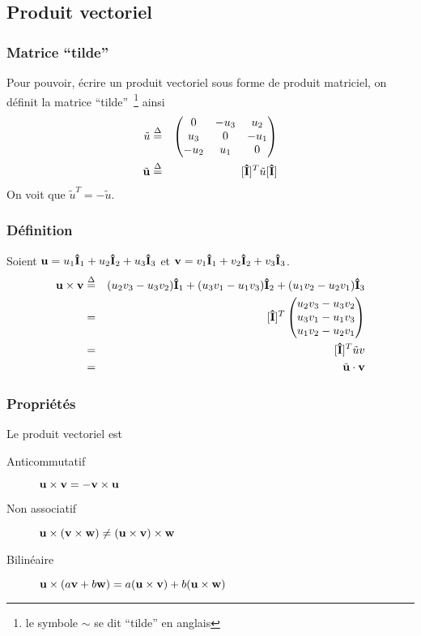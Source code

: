 \documentclass[11pt,a4paper]{article}
\newcommand\fv[1]{{\bf #1}} %
\newcommand\ui{{\bf\hat{I}}} %
\newcommand\eqdef{\stackrel{\Delta}{=}}
\begin{document}
\subsection{Produit vectoriel}

\subsubsection{Matrice ``tilde''}
Pour pouvoir, écrire un produit vectoriel sous forme de produit matriciel, on définit la matrice ``tilde''~\footnote{le symbole $\sim$ se dit ``tilde'' en anglais} ainsi
\begin{eqnarray*}
	\tilde{u} & \eqdef & \begin{pmatrix}0 & -u_3 & u_2\\ u_3 & 0 & -u_1\\ -u_2 & u_1 & 0\end{pmatrix}\\
	\tilde{\fv{u}} & \eqdef & [\ui]^T \tilde{u} [\ui]
\end{eqnarray*}
On voit que $\tilde{u}^T = -\tilde{u}$.

\subsubsection{Définition}
Soient $\fv{u} = u_1\ui_1 + u_2\ui_2 + u_3\ui_3$ et $\fv{v} = v_1\ui_1 + v_2\ui_2 + v_3\ui_3$.
\begin{eqnarray*}
	\fv{u}\times\fv{v} & \eqdef & (u_2v_3 - u_3v_2) \ui_1 + (u_3v_1 - u_1v_3) \ui_2 + (u_1v_2 - u_2v_1) \ui_3\\
	& = & [\ui]^T \begin{pmatrix}u_2v_3 - u_3v_2 \\ u_3v_1 - u_1v_3 \\ u_1v_2 - u_2v_1\end{pmatrix}\\
	& = & [\ui]^T \tilde{u}v\\
	& = & \tilde{\fv{u}}\cdot\fv{v}
\end{eqnarray*}

\subsubsection{Propriétés}
Le produit vectoriel est
\begin{description}
	\item[Anticommutatif] $\fv{u} \times \fv{v} = - \fv{v} \times \fv{u}$
	\item[Non associatif] $\fv{u} \times (\fv{v} \times \fv{w}) \neq (\fv{u} \times \fv{v}) \times \fv{w}$
	\item[Bilinéaire] $\fv{u} \times (a\fv{v} + b\fv{w}) = a (\fv{u} \times \fv{v}) + b (\fv{u} \times \fv{w})$
\end{description}
\end{document}
